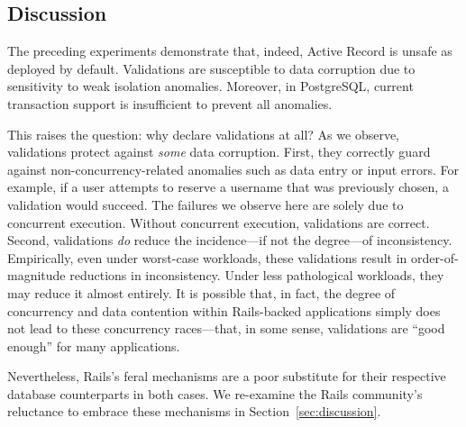 \subsection{Discussion}

The preceding experiments demonstrate that, indeed, Active Record is
unsafe as deployed by default. Validations are susceptible to data
corruption due to sensitivity to weak isolation anomalies. Moreover,
in PostgreSQL, current transaction support is insufficient to prevent
all anomalies.

This raises the question: why declare validations at all? As we
observe, validations protect against \textit{some} data
corruption. First, they correctly guard against
non-concurrency-related anomalies such as data entry or input
errors. For example, if a user attempts to reserve a username that was
previously chosen, a validation would succeed. The failures we observe
here are solely due to concurrent execution. Without concurrent
execution, validations are correct. Second, validations
\textit{do} reduce the incidence---if not the degree---of
inconsistency. Empirically, even under worst-case workloads, these
validations result in order-of-magnitude reductions in
inconsistency. Under less pathological workloads, they may reduce it
almost entirely. It is possible that, in fact, the degree of
concurrency and data contention within Rails-backed applications
simply does not lead to these concurrency races---that, in some sense,
validations are ``good enough'' for many applications.

Nevertheless, Rails's feral mechanisms are a poor substitute for their
respective database counterparts in both cases. We re-examine the Rails community's
reluctance to embrace these mechanisms in Section~\ref{sec:discussion}.

